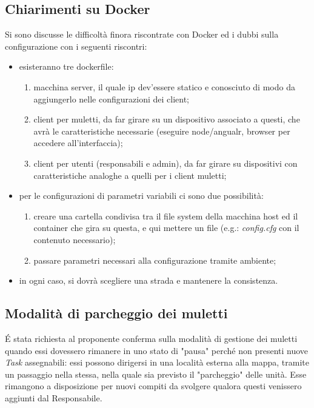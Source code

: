 \subsection{Chiarimenti su Docker}
Si sono discusse le difficoltà finora riscontrate con Docker ed i dubbi sulla configurazione con i seguenti riscontri:
\begin{itemize}
    \item esisteranno tre dockerfile:
    \begin{enumerate}
        \item macchina server, il quale ip dev'essere statico e conosciuto di modo da aggiungerlo nelle configurazioni dei client;
        \item client per muletti, da far girare su un dispositivo associato a questi, che avrà le caratteristiche necessarie (eseguire node/angualr, browser per accedere all'interfaccia);
        \item client per utenti (responsabili e admin), da far girare su dispositivi con caratteristiche analoghe a quelli per i client muletti;
    \end{enumerate}
    \item per le configurazioni di parametri variabili ci sono due possibilità:
    \begin{enumerate}
        \item creare una cartella condivisa tra il file system della macchina host ed il container che gira su questa, e qui mettere un file (e.g.: \textit{config.cfg} con il contenuto necessario);
        \item passare parametri necessari alla configurazione tramite ambiente;
    \end{enumerate}
    \item in ogni caso, si dovrà scegliere una strada e mantenere la consistenza.
\end{itemize}


\subsection{Modalità di parcheggio dei muletti}

\'E stata richiesta al proponente conferma sulla modalità di gestione dei muletti quando essi dovessero rimanere in uno stato di "pausa" perché non presenti nuove \textit{Task} assegnabili: essi possono dirigersi in una località esterna alla mappa, tramite un passaggio nella stessa, nella quale sia previsto il "parcheggio" delle unità. Esse rimangono a disposizione per nuovi compiti da svolgere qualora questi venissero aggiunti dal Responsabile.

